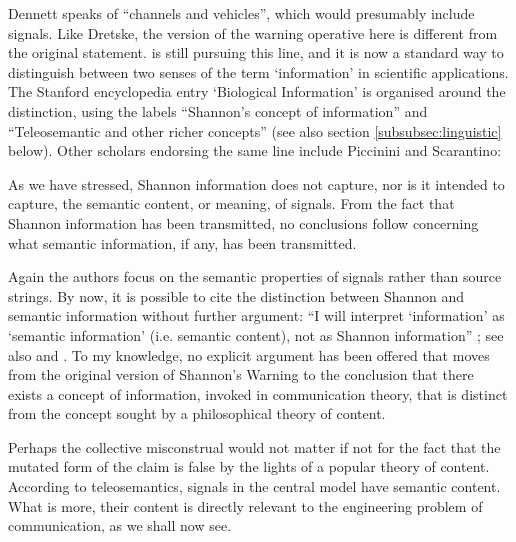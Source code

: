 \noindent Dennett speaks of ``channels and vehicles'', which would presumably include signals.
Like Dretske, the version of the warning operative here is different from the original statement.
\citet[$\S$6]{dennett2017bacteria} is still pursuing this line, and it is now a standard way to 
distinguish between two senses of the term `information' in scientific applications.
The Stanford encyclopedia entry `Biological Information' is organised around the distinction, using the labels ``Shannon's concept of information'' and ``Teleosemantic and other richer concepts'' \citep{godfrey-smith2016biological} (see also section \ref{subsubsec:linguistic} below).
Other scholars endorsing the same line include Piccinini and Scarantino:

\begin{myquote}
As we have stressed, Shannon information does not capture, nor is it intended to capture, the semantic content, or meaning, of signals. From the fact that Shannon information has been transmitted, no conclusions follow concerning what semantic information, if any, has been transmitted.
\par\hspace*{\fill}\citet[21]{piccinini2011information}
\end{myquote}

\noindent Again the authors focus on the semantic properties of signals rather than source strings.
By now, it is possible to cite the distinction between Shannon and semantic information without further argument: ``I will interpret ‘information’ as ‘semantic information’ (i.e. semantic content), not as Shannon information'' \citep[p. 12 n. 14]{artiga2020signals}; see also \citet[6]{cao2020new} and \citet[1]{kolchinsky2018semantic}.
To my knowledge, no explicit argument has been offered that moves from the original version of {\sc Shannon's Warning} to the conclusion that there exists a concept of information, invoked in communication theory, that is distinct from the concept sought by a philosophical theory of content.

Perhaps the collective misconstrual would not matter if not for the fact that the mutated form of the claim is false by the lights of a popular theory of content.
According to teleosemantics, signals in the central model have semantic content.
What is more, their content is directly relevant to the engineering problem of communication, as we shall now see.



